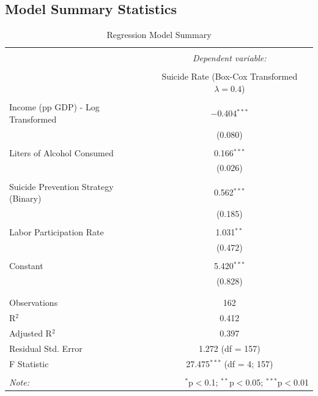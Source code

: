 \documentclass[]{article}
\begin{document}
\subsection{Model Summary Statistics}\label{model-summary-statistics}

\begin{table}[H] \centering 
  \caption {Regression Model Summary} 
  \label{tab:title} 
\begin{tabular}{@{\extracolsep{5pt}}lc} 
\\[-1.8ex]\hline 
\hline \\[-1.8ex] 
 & \multicolumn{1}{c}{\textit{Dependent variable:}} \\ 
\cline{2-2} 
\\[-1.8ex] & Suicide Rate (Box-Cox Transformed $\lambda = 0.4$) \\ 
\hline \\[-1.8ex] 
 Income (pp GDP) - Log Transformed & $-$0.404$^{***}$ \\ 
  & (0.080) \\ 
  & \\ 
Liters of Alcohol Consumed & 0.166$^{***}$ \\ 
  & (0.026) \\ 
  & \\ 
Suicide Prevention Strategy (Binary) & 0.562$^{***}$ \\ 
  & (0.185) \\ 
  & \\ 
Labor Participation Rate & 1.031$^{**}$ \\ 
  & (0.472) \\ 
  & \\ 
 Constant & 5.420$^{***}$ \\ 
  & (0.828) \\ 
  & \\ 
\hline \\[-1.8ex] 
Observations & 162 \\ 
R$^{2}$ & 0.412 \\ 
Adjusted R$^{2}$ & 0.397 \\ 
Residual Std. Error & 1.272 (df = 157) \\ 
F Statistic & 27.475$^{***}$ (df = 4; 157) \\ 
\hline 
\hline \\[-1.8ex] 
\textit{Note:}  & \multicolumn{1}{r}{$^{*}$p$<$0.1; $^{**}$p$<$0.05; $^{***}$p$<$0.01} \\ 
\end{tabular} 
\end{table}
\end{document}
